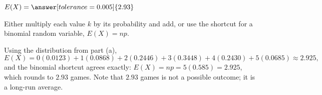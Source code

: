 \documentclass[12pt]{ximera}
\begin{document}
\begin{problem}
\begin{prompt}
$E(X) = \answer[tolerance=0.005]{2.93}$

\begin{hint}
Either multiply each value $k$ by its probability and add, or use the shortcut for a
binomial random variable, $E(X)=np$.
\end{hint}

\begin{feedback}
Using the distribution from part (a),
\[
E(X)=0(0.0123)+1(0.0868)+2(0.2446)+3(0.3448)+4(0.2430)+5(0.0685)\approx 2.925,
\]
and the binomial shortcut agrees exactly: $E(X)=np=5(0.585)=2.925$, which rounds to
$2.93$ games. Note that $2.93$ games is not a possible outcome; it is a long-run
average.
\end{feedback}
\end{prompt}
\end{problem}
\end{document}
